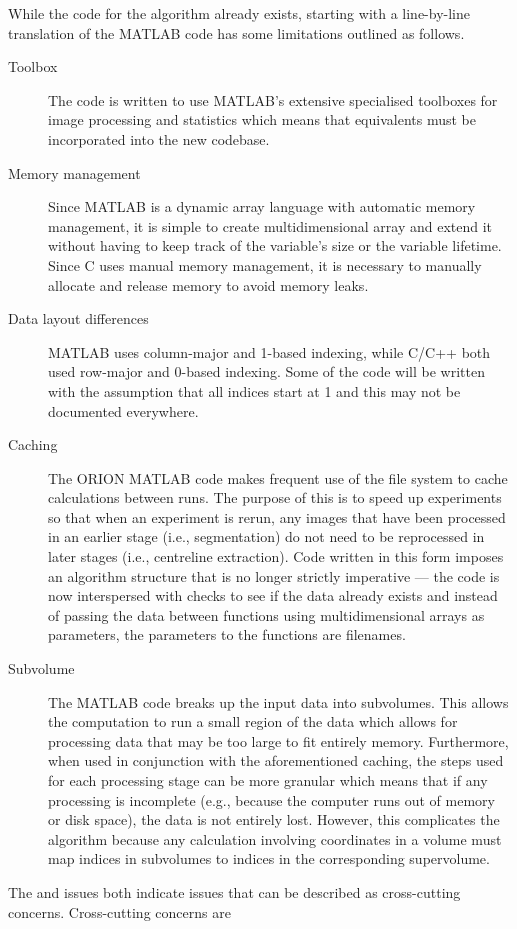 While the code for the algorithm already exists, starting with a line-by-line
translation of the MATLAB code has some limitations outlined as follows.
\begin{description}
\item[Toolbox\label{desc:matlab:toolbox}] The code is written to use MATLAB's extensive 
	specialised toolboxes for image processing and
	statistics which means that equivalents must be
	incorporated into the new codebase.
\item[Memory management\label{desc:matlab:mem}] Since MATLAB is a dynamic array language with
	automatic memory management, it is simple to create
	multidimensional array and extend it without having to
	keep track of the variable's size or the variable
	lifetime. Since C uses manual memory management, it is
	necessary to manually allocate and release memory to avoid
	memory leaks.
\item[Data layout differences] %
	MATLAB uses column-major and 1-based indexing, while C/C++
	both used row-major and 0-based indexing. Some of the code
	will be written with the assumption that all indices start
	at 1 and this may not be documented everywhere.
\item[Caching\label{desc:matlab:cache}] The ORION MATLAB code makes frequent use of the file system
	to cache calculations between runs. The purpose of this is
	to speed up experiments so that when an experiment is
	rerun, any images that have been processed in an earlier
	stage (i.e., segmentation) do not need to be reprocessed
	in later stages (i.e., centreline extraction). Code
	written in this form imposes an algorithm structure
	that is no longer strictly imperative --- the code is now
	interspersed with checks to see if the data already exists
	and instead of passing the data between functions using
	multidimensional arrays as parameters, the parameters to
	the functions are filenames.
\item[Subvolume\label{desc:matlab:subvol}] The MATLAB code breaks up the input data into
	subvolumes. This allows the computation to run a small
	region of the data which allows for processing data that
	may be too large to fit entirely memory. Furthermore, when
	used in conjunction with the aforementioned caching, the
	steps used for each processing stage can be more granular
	which means that if any processing is incomplete (e.g.,
	because the computer runs out of memory or disk space),
	the data is not entirely lost. However, this complicates
	the algorithm because any calculation involving
	coordinates in a volume must map indices in subvolumes to
	indices in the corresponding supervolume.
\end{description}

The  and  issues both
indicate issues that can be described as cross-cutting concerns. Cross-cutting
concerns are  %

